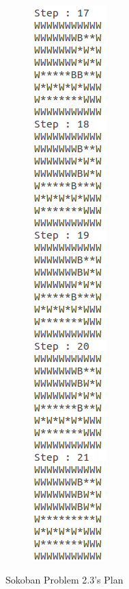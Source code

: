 \documentclass[10pt, letter]{article}
\begin{document}
\begin{figure} [h!]
\begin{subfigure}{.3\textwidth}
  \includegraphics[scale = 0.35]{images/sokoban3-ans5}
\end{subfigure}%
\caption{Sokoban Problem 2.3's Plan}
\label{sokoans3}
\end{figure}
\end{document}
